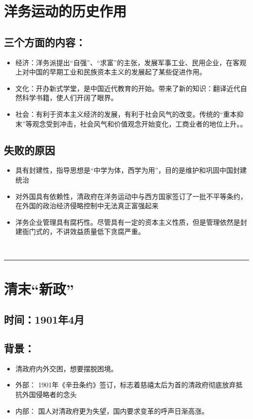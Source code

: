 \documentclass{article}
\begin{document}
\section*{洋务运动的历史作用}
\subsection*{三个方面的内容：}
\begin{itemize}
    \item 经济：洋务派提出``自强''、``求富''的主张，发展军事工业、民用企业，在客观上对中国的早期工业和民族资本主义的发展起了某些促进作用。
    \item 文化：开办新式学堂，是中国近代教育的开始。带来了新的知识：翻译近代自然科学书籍，使人们开阔了眼界。
    \item 社会：有利于资本主义经济的发展，有利于社会风气的改变。传统的``重本抑末''等观念受到冲击，社会风气和价值观念开始变化，工商业者的地位上升。。
\end{itemize}
\subsection*{失败的原因}
\begin{itemize}
	\item 具有封建性，指导思想是“中学为体，西学为用”，目的是维护和巩固中国封建统治
	\item 对外国具有依赖性，清政府在洋务运动中与西方国家签订了一批不平等条约，在外国的政治经济侵略控制中无法真正富强起来
	\item 洋务企业管理具有腐朽性。尽管具有一定的资本主义性质，但是管理依然是封建衙门式的，不讲效益质量低下贪腐严重。
\end{itemize}
\ \hrule

\section*{清末``新政''}
\subsection*{时间：1901年4月}
\subsection*{背景：}
\begin{itemize}
	\item 清政府内外交困，想要摆脱困境。
	\item 外部： 1901年《辛丑条约》签订，标志着慈禧太后为首的清政府彻底放弃抵抗外国侵略者的念头
	\item 内部： 国人对清政府更为失望，国内要求变革的呼声日渐高涨。
\end{itemize}
\end{document}
